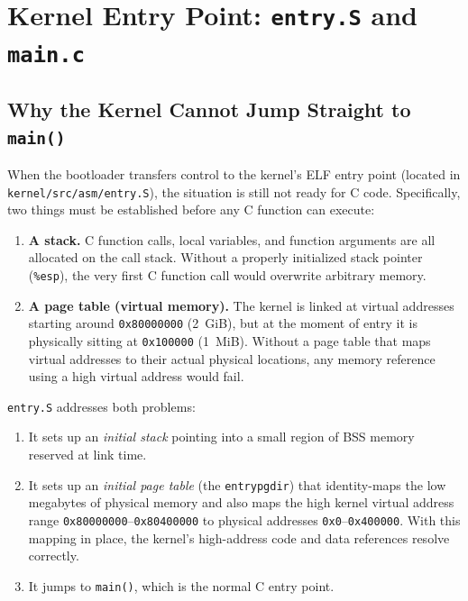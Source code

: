\documentclass[11pt]{article}
\begin{document}
\section{Kernel Entry Point: \texttt{entry.S} and \texttt{main.c}}

\subsection{Why the Kernel Cannot Jump Straight to \texttt{main()}}

When the bootloader transfers control to the kernel's ELF entry point (located in \texttt{kernel/src/asm/entry.S}), the situation is still not ready for C code. Specifically, two things must be established before any C function can execute:

\begin{enumerate}
    \item \textbf{A stack.} C function calls, local variables, and function arguments are all allocated on the call stack. Without a properly initialized stack pointer (\texttt{\%esp}), the very first C function call would overwrite arbitrary memory.
    \item \textbf{A page table (virtual memory).} The kernel is linked at virtual addresses starting around \texttt{0x80000000} (2~GiB), but at the moment of entry it is physically sitting at \texttt{0x100000} (1~MiB). Without a page table that maps virtual addresses to their actual physical locations, any memory reference using a high virtual address would fail.
\end{enumerate}

\texttt{entry.S} addresses both problems:
\begin{enumerate}
    \item It sets up an \emph{initial stack} pointing into a small region of BSS memory reserved at link time.
    \item It sets up an \emph{initial page table} (the \texttt{entrypgdir}) that identity-maps the low megabytes of physical memory and also maps the high kernel virtual address range \texttt{0x80000000}--\texttt{0x80400000} to physical addresses \texttt{0x0}--\texttt{0x400000}. With this mapping in place, the kernel's high-address code and data references resolve correctly.
    \item It jumps to \texttt{main()}, which is the normal C entry point.
\end{enumerate}
\end{document}
